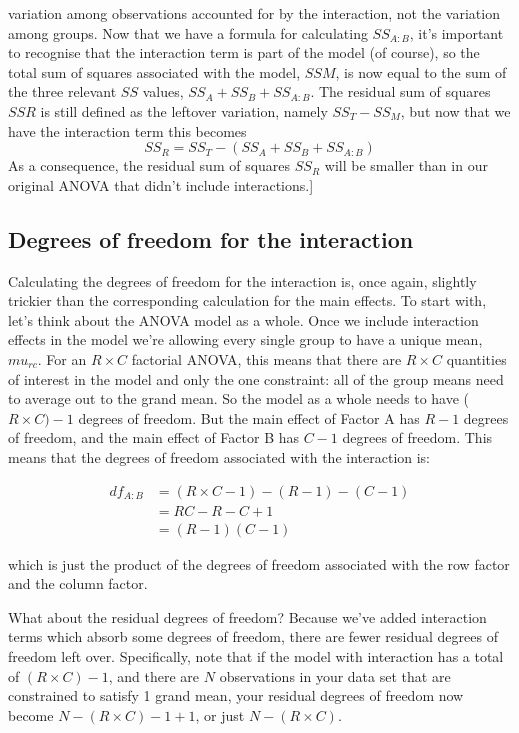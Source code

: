 \documentclass[
  a4paper,
]{book}
\begin{document}
{  variation among observations accounted for by the interaction, not the
  variation among groups. Now that we have a formula for calculating
  \(SS_{A:B}\), it's important to recognise that the interaction term is
  part of the model (of course), so the total sum of squares associated
  with the model, \(SSM\), is now equal to the sum of the three relevant
  \(SS\) values, \(SS_A + SS_B + SS_{A:B}\). The residual sum of squares
  \(SSR\) is still defined as the leftover variation, namely
  \(SS_T - SS_M\), but now that we have the interaction term this
  becomes \[SS_R=SS_T-(SS_A+SS_B+SS_{A:B})\] As a consequence, the
  residual sum of squares \(SS_R\) will be smaller than in our original
  ANOVA that didn't include interactions.}{]}

\hypertarget{degrees-of-freedom-for-the-interaction}{%
\subsection{Degrees of freedom for the
interaction}\label{degrees-of-freedom-for-the-interaction}}

Calculating the degrees of freedom for the interaction is, once again,
slightly trickier than the corresponding calculation for the main
effects. To start with, let's think about the ANOVA model as a whole.
Once we include interaction effects in the model we're allowing every
single group to have a unique mean, \(mu_{rc}\). For an \(R \times C\)
factorial ANOVA, this means that there are \(R \times C\) quantities of
interest in the model and only the one constraint: all of the group
means need to average out to the grand mean. So the model as a whole
needs to have (\(R \times C)-1\) degrees of freedom. But the main effect
of Factor A has \(R-1\) degrees of freedom, and the main effect of
Factor B has \(C-1\) degrees of freedom. This means that the degrees of
freedom associated with the interaction is:

\[
\begin{aligned}
df_{A:B} & = (R \times C - 1) - (R - 1) - (C - 1) \\
& = RC - R - C + 1 \\
& = (R-1)(C-1)
\end{aligned}
\]

which is just the product of the degrees of freedom associated with the
row factor and the column factor.

What about the residual degrees of freedom? Because we've added
interaction terms which absorb some degrees of freedom, there are fewer
residual degrees of freedom left over. Specifically, note that if the
model with interaction has a total of \((R \times C) - 1\), and there
are \(N\) observations in your data set that are constrained to satisfy
1 grand mean, your residual degrees of freedom now become
\(N - (R \times C) - 1 + 1\), or just \(N - (R \times C)\).
\end{document}
